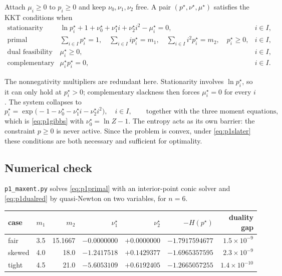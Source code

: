 \documentclass[11pt]{article}
\theoremstyle{definition}
\begin{document}
Attach $\mu_i \ge 0$ to $p_i \ge 0$ and keep $\nu_0,\nu_1,\nu_2$ free.
A pair $(p^\star,\nu^\star,\mu^\star)$ satisfies the KKT conditions when
\[
\begin{array}{llll}
  \text{stationarity} &
    \ln p_i^\star + 1 + \nu_0^\star + \nu_1^\star i
      + \nu_2^\star i^2 - \mu_i^\star = 0, & i \in I,\\[2pt]
  \text{primal feasibility} &
    \displaystyle\sum_{i \in I} p^\star_i = 1,\quad
    \sum_{i \in I} i p^\star_i = m_1,\quad
    \sum_{i \in I} i^2 p^\star_i = m_2,\quad
    p^\star_i \ge 0, & i \in I,\\[8pt]
  \text{dual feasibility} & \mu^\star_i \ge 0, & i \in I,\\[2pt]
  \text{complementary slackness} & \mu^\star_i p^\star_i = 0, & i \in I.
\end{array}
\]

The nonnegativity multipliers are redundant here. Stationarity involves
$\ln p_i^\star$, so it can only hold at $p_i^\star > 0$; complementary
slackness then forces $\mu_i^\star = 0$ for every $i$. The system
collapses to
\[
  p_i^\star = \exp\!\bigl(-1-\nu_0^\star-\nu_1^\star i
      - \nu_2^\star i^2\bigr), \quad i \in I,
  \qquad\text{together with the three moment equations,}
\]
which is \eqref{eq:p1gibbs} with $\nu_0^\star = \ln Z - 1$. The entropy
acts as its own barrier: the constraint $p \ge 0$ is never active. Since
the problem is convex, under \eqref{eq:p1slater} these conditions are
both necessary and sufficient for optimality.

\subsection*{Numerical check}

\texttt{p1\_maxent.py} solves \eqref{eq:p1primal} with an interior-point
conic solver and \eqref{eq:p1dualred} by quasi-Newton on two variables,
for $n = 6$.

\begin{center}
\begin{tabular}{@{}lrrrrrr@{}}
\toprule
case & $m_1$ & $m_2$ & $\nu_1^\star$ & $\nu_2^\star$
  & $-H(p^\star)$ & duality gap\\
\midrule
fair    & 3.5 & 15.1667 & $-0.0000000$ & $+0.0000000$
  & $-1.7917594677$ & $1.5\times10^{-9}$\\
skewed  & 4.0 & 18.0    & $-1.2417518$ & $+0.1429377$
  & $-1.6965357595$ & $2.3\times10^{-9}$\\
tight   & 4.5 & 21.0    & $-5.6053109$ & $+0.6192405$
  & $-1.2665057255$ & $1.4\times10^{-10}$\\
\bottomrule
\end{tabular}
\end{center}
\end{document}
